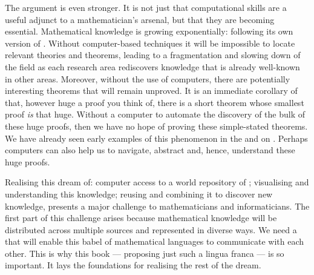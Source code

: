 The argument is even stronger. It is not just that computational skills are a useful
adjunct to a mathematician's arsenal, but that they are becoming essential. Mathematical
knowledge is growing exponentially: following its own version of {}.
Without computer-based {} techniques it will be impossible
to locate relevant theories and theorems, leading to a fragmentation and slowing down of
the field as each research area rediscovers knowledge that is already well-known in other
areas. Moreover, without the use of computers, there are potentially interesting theorems
that will remain unproved. It is an immediate corollary of
{} that, however huge a proof you think of,
there is a short theorem whose smallest proof {\emph{is}} that huge.  Without a computer
to automate the discovery of the bulk of these huge proofs, then we have no hope of
proving these simple-stated theorems.  We have already seen early examples of this
phenomenon in the {} and {} on
{}.  Perhaps computers can also help us to navigate, abstract
and, hence, understand these huge proofs.

Realising this dream of: computer access to a world repository of
{}; visualising and understanding this knowledge; reusing
and combining it to discover new knowledge, presents a major challenge to mathematicians
and informaticians.  The first part of this challenge arises because mathematical
knowledge will be distributed across multiple sources and represented in diverse ways. We
need a {} that will enable this babel of mathematical languages to
communicate with each other. This is why this book --- proposing just such a lingua franca
--- is so important. It lays the foundations for realising the rest of the dream.

